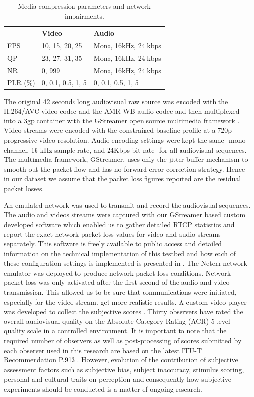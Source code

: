 \documentclass[journal]{IEEEtran}
\begin{document}
\begin{table}
\centering
\caption{Media compression parameters and network impairments.}
\label{tab:dataset_media}
\begin{tabular}{|l|l|l|} \hline
& Video & Audio \\ \hline
FPS & 10, 15, 20, 25 & Mono, 16kHz, 24 kbps \\ \hline
QP & 23, 27, 31, 35 & Mono, 16kHz, 24 kbps  \\ \hline
NR & 0, 999 & Mono, 16kHz, 24 kbps \\ \hline
PLR (\%) & 0, 0.1, 0.5, 1, 5 & 0, 0.1, 0.5, 1, 5 \\ \hline
\end{tabular}
\end{table}

The original 42 seconds long audiovisual raw source was encoded with the H.264/AVC video codec and the AMR-WB audio codec and then multiplexed into a 3gp container with the GStreamer open source multimedia framework \cite{teamgstreamer}.  Video streams were encoded with the constrained-baseline profile at a 720p progressive video resolution. Audio encoding settings were kept the same -mono channel, 16 kHz sample rate, and 24Kbps bit rate- for all audiovisual sequences. The multimedia framework, GStreamer, uses only the jitter buffer mechanism to smooth out the packet flow and has no forward error correction strategy. Hence in our dataset we assume that the packet loss figures reported are the residual packet losses.

An emulated network was used to transmit and record the audiovisual sequences. The audio and videos streams were captured with our GStreamer based custom developed software which enabled us to gather detailed RTCP statistics and report the exact network packet loss values for video and audio streams separately. This software is freely available to public access \cite{demirbilek2016githubGStreamertestbed} and detailed information on the technical implementation of this testbed and how each of these configuration settings is implemented is presented in \cite{demirbilek2016multimedia}. The Netem network emulator was deployed to produce network packet loss conditions. Network packet loss was only activated after the first second of the audio and video transmission. This allowed us to be sure that communications were initiated, especially for the video stream. get more realistic results. A custom video player was developed to collect the subjective scores \cite{demirbilek2016githubplayer}. Thirty observers have rated the overall audiovisual quality on the Absolute Category Rating (ACR) 5-level quality scale in a controlled environment. It is important to note that the required number of observers as well as post-processing of scores submitted by each observer used in this research are based on the latest ITU-T Recommendation P.913 \cite{itu913subjective}. However, evolution of the contribution of subjective assessment factors such as subjective bias, subject inaccuracy, stimulus scoring, personal and cultural traits on perception and consequently how subjective experiments should be conducted is a matter of ongoing research.
\end{document}
